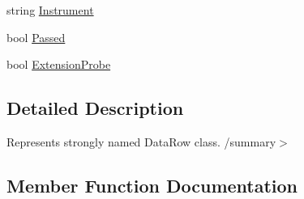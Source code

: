 \begin{DoxyCompactItemize}
string \hyperlink{class_env_int_1_1_win32_1_1_field_tech_1_1_manager_1_1_data_sets_1_1_guide_ware_mobile_data_set_1_1_drift_calibration_row_a4fb59904a490da63531bd4cf9d59fbbf}{Instrument}
\item 
bool \hyperlink{class_env_int_1_1_win32_1_1_field_tech_1_1_manager_1_1_data_sets_1_1_guide_ware_mobile_data_set_1_1_drift_calibration_row_a81a4933009cc69fcaf2959d61f5de569}{Passed}
\item 
bool \hyperlink{class_env_int_1_1_win32_1_1_field_tech_1_1_manager_1_1_data_sets_1_1_guide_ware_mobile_data_set_1_1_drift_calibration_row_a5e83da0774e9699a3f524018683a7ef0}{Extension\+Probe}
\end{DoxyCompactItemize}


\subsection{Detailed Description}
Represents strongly named Data\+Row class. /summary$>$ 

\subsection{Member Function Documentation}
\hypertarget{class_env_int_1_1_win32_1_1_field_tech_1_1_manager_1_1_data_sets_1_1_guide_ware_mobile_data_set_1_1_drift_calibration_row_a2abe484cbbc2a67529e9b8be9581eab9}{}
